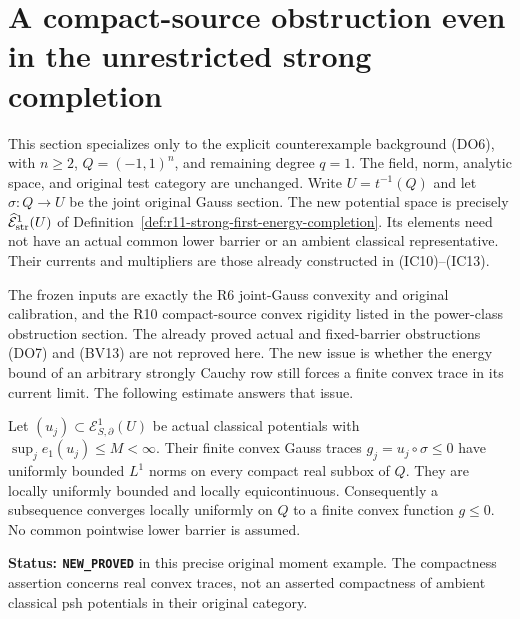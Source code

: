 \section{A compact-source obstruction even in the unrestricted strong completion}
\label{sec:r11-strong-completion-source-obstruction}

This section specializes only to the explicit counterexample background
(DO6), with $n\geq2$, $Q=(-1,1)^n$, and remaining degree $q=1$.
The field, norm, analytic space, and original test category are unchanged.
Write $U=t^{-1}(Q)$ and let $\sigma:Q\to U$ be the joint original
Gauss section.  The new potential space is precisely
$\widehat{\mathcal E}^{1}_{\rm str}(U)$ of
Definition~\ref{def:r11-strong-first-energy-completion}.
Its elements need not have an actual common lower barrier or an
ambient classical representative.  Their currents and multipliers
are those already constructed in (IC10)--(IC13).

The frozen inputs are exactly the R6 joint-Gauss convexity and
original calibration, and the R10 compact-source convex rigidity
listed in the power-class obstruction section.  The already proved
actual and fixed-barrier obstructions (DO7) and (BV13) are not
reproved here.  The new issue is whether the energy bound of an
arbitrary strongly Cauchy row still forces a finite convex trace
in its current limit.  The following estimate answers that issue.

\begin{lemma}
\label{lem:r11-energy-bounded-convex-trace-compactness}
Let $(u_j)\subset\mathcal E^1_{S,\partial}(U)$ be actual classical
potentials with $\sup_j e_1(u_j)\leq M<\infty$.
Their finite convex Gauss traces $g_j=u_j\circ\sigma\leq0$ have
uniformly bounded $L^1$ norms on every compact real subbox of $Q$.
They are locally uniformly bounded and locally equicontinuous.
Consequently a subsequence converges locally uniformly on $Q$
to a finite convex function $g\leq0$.
No common pointwise lower barrier is assumed.
\end{lemma}

\noindent\textbf{Status: \texttt{NEW\_PROVED}} in this precise
original moment example.  The compactness assertion concerns real
convex traces, not an asserted compactness of ambient classical psh
potentials in their original category.

